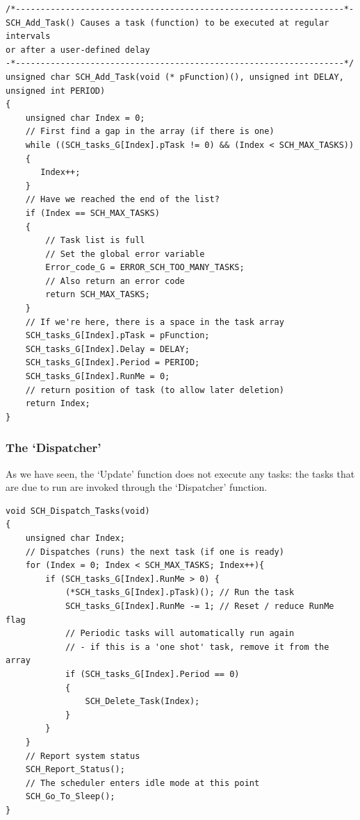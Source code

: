\documentclass[twoside, final]{hcmut_report}
\begin{document}
\begin{lstlisting}[basicstyle=\small, caption=An implementation of the scheduler ‘add task’ function]
/*------------------------------------------------------------------*-
SCH_Add_Task() Causes a task (function) to be executed at regular intervals 
or after a user-defined delay
-*------------------------------------------------------------------*/
unsigned char SCH_Add_Task(void (* pFunction)(), unsigned int DELAY, unsigned int PERIOD) 
{
    unsigned char Index = 0;
    // First find a gap in the array (if there is one)
    while ((SCH_tasks_G[Index].pTask != 0) && (Index < SCH_MAX_TASKS))
    {
       Index++;
    } 
    // Have we reached the end of the list? 
    if (Index == SCH_MAX_TASKS)
    {
        // Task list is full
        // Set the global error variable
        Error_code_G = ERROR_SCH_TOO_MANY_TASKS;
        // Also return an error code
        return SCH_MAX_TASKS; 
    }
    // If we're here, there is a space in the task array
    SCH_tasks_G[Index].pTask = pFunction;
    SCH_tasks_G[Index].Delay = DELAY;
    SCH_tasks_G[Index].Period = PERIOD;
    SCH_tasks_G[Index].RunMe = 0;
    // return position of task (to allow later deletion)
    return Index; 
}
\end{lstlisting}


\subsubsection{The ‘Dispatcher’}
As we have seen, the ‘Update’ function does not execute any tasks: the tasks that are
due to run are invoked through the ‘Dispatcher’ function.

\begin{lstlisting}[basicstyle=\small, caption=An implementation of the scheduler ‘dispatch task’ function]
void SCH_Dispatch_Tasks(void) 
{
    unsigned char Index;
    // Dispatches (runs) the next task (if one is ready)
    for (Index = 0; Index < SCH_MAX_TASKS; Index++){
        if (SCH_tasks_G[Index].RunMe > 0) {
            (*SCH_tasks_G[Index].pTask)(); // Run the task
            SCH_tasks_G[Index].RunMe -= 1; // Reset / reduce RunMe flag
            // Periodic tasks will automatically run again
            // - if this is a 'one shot' task, remove it from the array
            if (SCH_tasks_G[Index].Period == 0)
            {
                SCH_Delete_Task(Index);
            }
        } 
    }
    // Report system status
    SCH_Report_Status(); 
    // The scheduler enters idle mode at this point 
    SCH_Go_To_Sleep(); 
}
\end{lstlisting}
\end{document}
